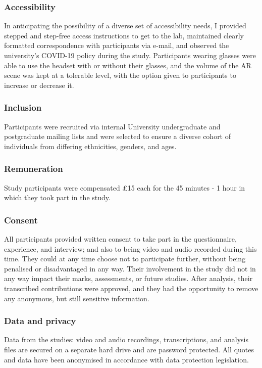 \subsubsection{Accessibility}\label{sec: polaris-ethics-accessibility}
In anticipating the possibility of a diverse set of accessibility needs, I provided stepped and step-free access instructions to get to the lab, maintained clearly formatted correspondence with participants via e-mail, and observed the university’s COVID-19 policy during the study. Participants wearing glasses were able to use the headset with or without their glasses, and the volume of the AR scene was kept at a tolerable level, with the option given to participants to increase or decrease it.

\subsubsection{Inclusion}\label{sec: polaris-ethics-inclusion}
Participants were recruited via internal University undergraduate and postgraduate mailing lists and were selected to ensure a diverse cohort of individuals from differing ethnicities, genders, and ages.

\subsubsection{Remuneration}\label{sec: polaris-ethics-renumeration}
Study participants were compensated £15 each for the 45 minutes - 1 hour in which they took part in the study.

\subsubsection{Consent}\label{sec: polaris-ethics-consent}
All participants provided written consent to take part in the questionnaire, experience, and interview; and also to being video and audio recorded during this time. They could at any time choose not to participate further, without being penalised or disadvantaged in any way. Their involvement in the study did not in any way impact their marks, assessments, or future studies. After analysis, their transcribed contributions were approved, and they had the opportunity to remove any anonymous, but still sensitive information.

\subsubsection{Data and privacy}\label{sec: polaris-ethics-data}
Data from the studies: video and audio recordings, transcriptions, and analysis files are secured on a separate hard drive and are password protected. All quotes and data have been anonymised in accordance with data protection legislation.


